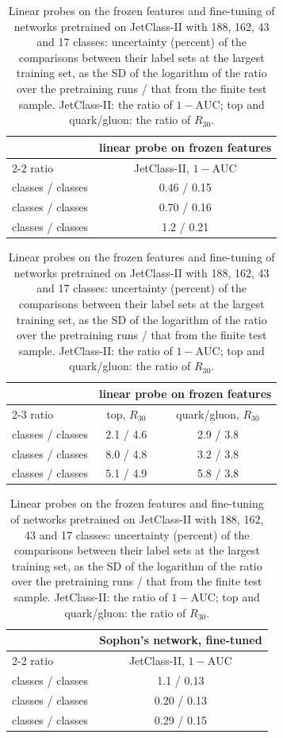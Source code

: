 \begin{table}[t]
\centering
\caption{Linear probes on the frozen features and fine-tuning of networks pretrained on JetClass-II with 188, 162, 43 and 17 classes: uncertainty (percent) of the comparisons between their label sets at the largest training set, as the SD of the logarithm of the ratio over the pretraining runs / that from the finite test sample. JetClass-II: the ratio of $1-\mathrm{AUC}$; top and quark/gluon: the ratio of $R_{30}$.}
\label{tab:boot}
\begin{tabular*}{\linewidth}{@{\extracolsep{\fill}}lc@{}}
\toprule
 & \multicolumn{1}{c}{linear probe on frozen features} \\
\cmidrule(lr){2-2}
ratio & JetClass-II, $1-\mathrm{AUC}$ \\
\midrule
\Kres{} classes / \Kfull{} classes & 0.46 / 0.15 \\
\Kmid{} classes / \Kfull{} classes & 0.70 / 0.16 \\
\Kcoarse{} classes / \Kfull{} classes & 1.2 / 0.21 \\
\bottomrule
\end{tabular*}
\par\bigskip
\begin{tabular*}{\linewidth}{@{\extracolsep{\fill}}lcc@{}}
\toprule
 & \multicolumn{2}{c}{linear probe on frozen features} \\
\cmidrule(lr){2-3}
ratio & top, $R_{30}$ & quark/gluon, $R_{30}$ \\
\midrule
\Kres{} classes / \Kfull{} classes & 2.1 / 4.6 & 2.9 / 3.8 \\
\Kmid{} classes / \Kfull{} classes & 8.0 / 4.8 & 3.2 / 3.8 \\
\Kcoarse{} classes / \Kfull{} classes & 5.1 / 4.9 & 5.8 / 3.8 \\
\bottomrule
\end{tabular*}
\par\bigskip
\begin{tabular*}{\linewidth}{@{\extracolsep{\fill}}lc@{}}
\toprule
 & \multicolumn{1}{c}{Sophon's network, fine-tuned} \\
\cmidrule(lr){2-2}
ratio & JetClass-II, $1-\mathrm{AUC}$ \\
\midrule
\Kres{} classes / \Kfull{} classes & 1.1 / 0.13 \\
\Kmid{} classes / \Kfull{} classes & 0.20 / 0.13 \\
\Kcoarse{} classes / \Kfull{} classes & 0.29 / 0.15 \\
\bottomrule
\end{tabular*}

\end{table}

